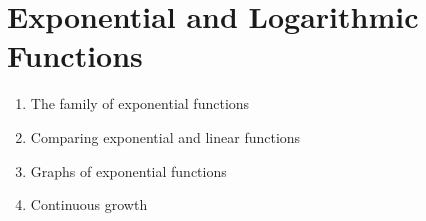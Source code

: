 
\chapter{Exponential and Logarithmic Functions}

\begin{enumerate}
\item The family of exponential functions

\item Comparing exponential and linear functions

\item Graphs of exponential functions

\item Continuous growth
\end{enumerate}
